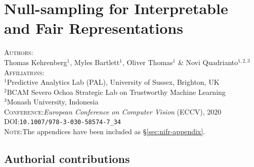 \chapter{Null-sampling for Interpretable and Fair Representations}\label{ch:nifr}
\textsc{Authors}:\\
%
Thomas Kehrenberg$^1$,
%
Myles Bartlett$^1$,
%
Oliver Thomas$^1$ \&
%
Novi Quadrianto$^{1,2,3}$ \\
%
\textsc{Affiliations}:\\
%
$^1$Predictive Analytics Lab (PAL), University of Sussex, Brighton, UK\\
%
$^2$BCAM Severo Ochoa Strategic Lab on Trustworthy Machine Learning \\
%
$^3$Monash University, Indonesia \\
%
\textsc{Conference}:\;\;\textit{European Conference on Computer Vision} (ECCV), 2020 \\
%
\textsc{DOI}:\;\;\texttt{10.1007/978-3-030-58574-7\_34} \\
%
\textsc{Note}:\;\;The appendices have been included as \S\ref{sec:nifr-appendix}.
%








\newpage

\clearpage
\section{Authorial contributions}


